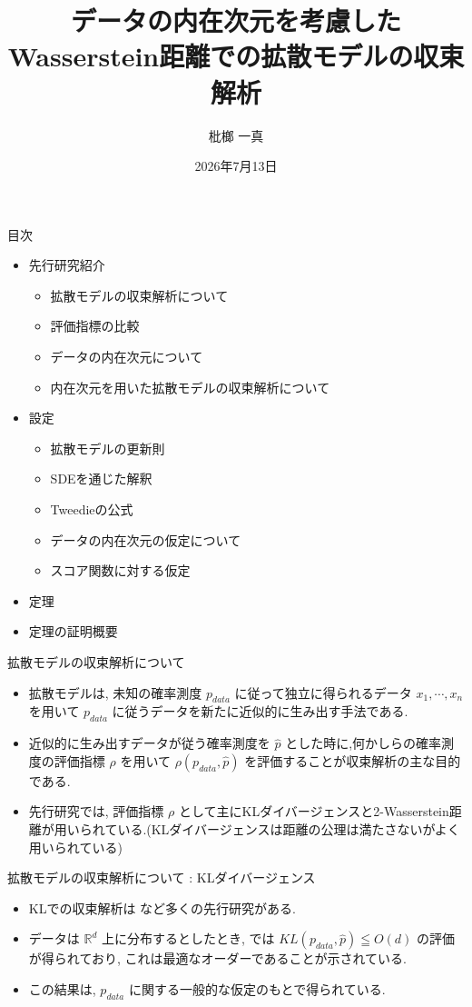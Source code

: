 \documentclass[11pt]{beamer}
\title{データの内在次元を考慮したWasserstein距離での拡散モデルの収束解析}
\author{枇榔 一真}
\institute{関根$\cdot$ 深澤 $\cdot$ 矢野 研究室}
\date{2026年7月13日}
\theoremstyle{plain}
\theoremstyle{definition}
\renewcommand{\cite}[1]{\citep{#1}}
\begin{document}
\begin{frame}
  \titlepage
\end{frame}
  \begin{frame}{目次}
    \begin{itemize}
      \item 先行研究紹介
      \begin{itemize}
        \item 拡散モデルの収束解析について
        \item 評価指標の比較
        \item データの内在次元について
        \item 内在次元を用いた拡散モデルの収束解析について
      \end{itemize}
      \item 設定
      \begin{itemize}
        \item 拡散モデルの更新則
        \item SDEを通じた解釈
        \item Tweedieの公式
        \item データの内在次元の仮定について
        \item スコア関数に対する仮定
      \end{itemize}
      \item 定理
      \item 定理の証明概要
    \end{itemize}
  \end{frame}
  \begin{frame}{拡散モデルの収束解析について}
    \begin{itemize}
      \item 拡散モデルは, 未知の確率測度 $p_{data}$ に従って独立に得られるデータ $x_1,\cdots, x_n$ を用いて $p_{data}$ に従うデータを新たに近似的に生み出す手法である.
      \item 近似的に生み出すデータが従う確率測度を $\hat{p}$ とした時に,何かしらの確率測度の評価指標 $\rho$ を用いて $\rho(p_{data},\hat{p})$ を評価することが収束解析の主な目的である.
      \item 先行研究では, 評価指標 $\rho$ として主にKLダイバージェンスと2-Wasserstein距離が用いられている.(KLダイバージェンスは距離の公理は満たさないがよく用いられている)
    \end{itemize}
  
  \end{frame}
  \begin{frame}{拡散モデルの収束解析について : KLダイバージェンス}
    \begin{itemize}
      \item KLでの収束解析は \cite{benton_et_al_2024, chen_lee_lu_2023, chen_et_al_2023, koike_2026_follmer} など多くの先行研究がある. 
      \item データは $\mathbb{R}^d$ 上に分布するとしたとき, \cite{benton_et_al_2024} では $KL(p_{data},\hat{p})\leqq O(d)$ の評価が得られており, これは最適なオーダーであることが示されている.
      \item この結果は, $p_{data}$ に関する一般的な仮定のもとで得られている.
    \end{itemize}
  
  \end{frame}
\end{document}
